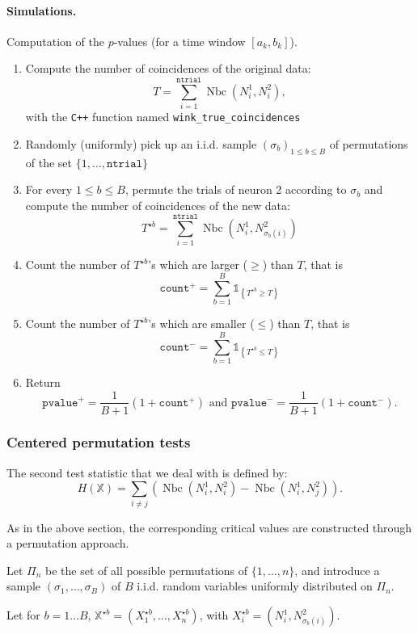 \documentclass[a4paper,oneside,10pt]{article}
\newcommand{\pa}[1]{\ensuremath{\left( #1 \right)}}
\newcommand{\Nbc}{\operatorname{Nbc}}
\newcommand{\X}{\ensuremath{\mathds{X}}}
\newcommand{\1}[1]{\ensuremath{\mathds{1}_{\left\{ #1 \right\}}}}  %
\begin{document}
\paragraph{Simulations.}
Computation of the $p$-values (for a time window $[a_k,b_k]$).
\begin{enumerate}
\item Compute the number of coincidences of the original data: 
$$T=\sum_{i=1}^{\texttt{ntrial}} \Nbc(N^1_i,N^2_{i}),$$
with the \texttt{C++} function named \texttt{wink\_true\_coincidences}
\item Randomly (uniformly) pick up an i.i.d. sample $\pa{\sigma_b}_{1\leq b\leq B}$ of permutations of the set $\{1,\ldots,\texttt{ntrial}\}$
\item For every $1\leq b\leq B$, permute the trials of neuron 2 according to $\sigma_b$ and compute the number of coincidences of the new data:
$$T^{\star b}=\sum_{i=1}^{\texttt{ntrial}} \Nbc(N^1_i,N^2_{\sigma_b(i)})$$
\item Count the number of $T^{\star b}$'s which are larger ($\geq$) than $T$, that is
$$\texttt{count}^+=\sum_{b=1}^B \1{T^{\star b}\geq T}$$
\item Count the number of $T^{\star b}$'s which are smaller ($\leq$) than $T$, that is
$$\texttt{count}^-=\sum_{b=1}^B \1{T^{\star b}\leq T}$$
\item Return $$\texttt{pvalue}^+=\frac{1}{B+1}\pa{1+\texttt{count}^+}\textrm{ and }\texttt{pvalue}^-=\frac{1}{B+1}\pa{1+\texttt{count}^-}.$$
\end{enumerate}

\subsubsection{Centered permutation tests}

The second test statistic that we deal with is defined by:
\begin{equation}\label{defstat2}
H(\X)=\sum_{i\neq j} \left(\Nbc(N_i^1,N_i^2)-\Nbc(N_i^1,N_j^2)\right).
\end{equation}

As in the above section, the corresponding critical values are constructed through a permutation approach.

Let $\Pi_n$ be the set of all possible permutations of $\{1,\ldots,n\}$, and  introduce  a sample  $\pa{\sigma_1,\ldots,\sigma_B}$ of $B$  i.i.d. random variables uniformly distributed on $\Pi_n$.

Let for $b=1\ldots B$, $\X^{\star b}=(X_1^{\star b},\ldots,X_n^{\star b})$, with $X_i^{\star b}=(N_i^1,N_{\sigma_b(i)}^2)$. 
\end{document}
